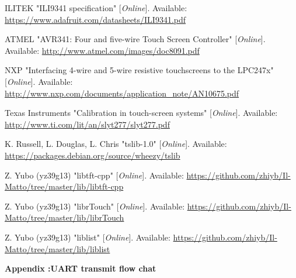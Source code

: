 \documentclass[a4paper,notitlepage,10pt]{report}
\newcommand{\tab}{\hspace{0.75cm}}
\newcommand{\fontHeading}{\fontsize{12pt}{13.2pt}\selectfont}
\newcommand{\fontRef}{\fontsize{9pt}{9.9pt}\selectfont}
\newcounter{appendix}
\renewcommand{\theappendix}{\Alph{appendix}}
\begin{document}
\begin{multicols}{2}
\fontRef
\begin{enumerate}[label={[\arabic*]},align=left,leftmargin=0.7cm,labelwidth=!,topsep=0pt,partopsep=0pt,parsep=0pt,itemsep=0pt]
\item
\label{ref:ili9341}
ILITEK "ILI9341 specification" [\textit{Online}]. Available: \url{https://www.adafruit.com/datasheets/ILI9341.pdf}
\item
\label{ref:tsATMEL}
ATMEL "AVR341: Four and five-wire Touch Screen Controller" [\textit{Online}]. Available: \url{http://www.atmel.com/images/doc8091.pdf}
\item
\label{ref:tsNXP}
NXP "Interfacing 4-wire and 5-wire resistive touchscreens to the LPC247x" [\textit{Online}]. Available: \url{http://www.nxp.com/documents/application_note/AN10675.pdf}
\item
\label{ref:tsTI}
Texas Instruments "Calibration in touch-screen systems" [\textit{Online}]. Available: \url{http://www.ti.com/lit/an/slyt277/slyt277.pdf}
\item
\label{ref:tslib}
K. Russell, L. Douglas, L. Chris "tslib-1.0" [\textit{Online}]. Available: \url{https://packages.debian.org/source/wheezy/tslib}
\item
\label{ref:libtft-cpp}
Z. Yubo (yz39g13) "libtft-cpp" [\textit{Online}]. Available: \url{https://github.com/zhiyb/Il-Matto/tree/master/lib/libtft-cpp}
\item
\label{ref:librTouch}
Z. Yubo (yz39g13) "librTouch" [\textit{Online}]. Available: \url{https://github.com/zhiyb/Il-Matto/tree/master/lib/librTouch}
\item
\label{ref:liblist}
Z. Yubo (yz39g13) "liblist" [\textit{Online}]. Available: \url{https://github.com/zhiyb/Il-Matto/tree/master/lib/liblist}
\end{enumerate}

\end{multicols}

\newpage
\fontHeading
{\label{apx:uartTX}}
\textbf{Appendix \theappendix:\tab UART transmit flow chat}
\vspace{10pt}
\end{document}
